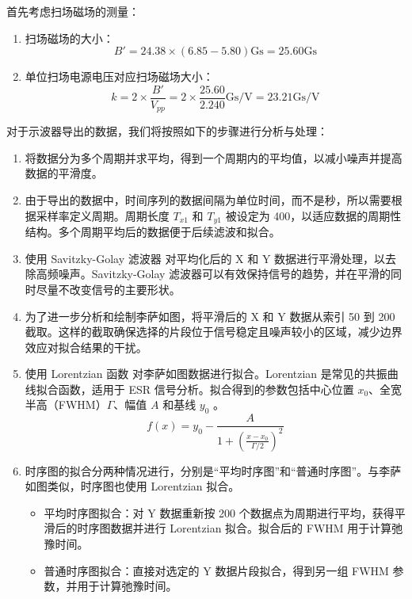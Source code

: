 \documentclass[dvipsnames, svgnames,a4paper,11pt]{article}
\begin{document}
		首先考虑扫场磁场的测量：
		\begin{enumerate}
			\item 扫场磁场的大小：
				\[
					B' = 24.38 \times (6.85 - 5.80) \mathrm{Gs} = 25.60 \mathrm{Gs}
				\]

			\item 单位扫场电源电压对应扫场磁场大小：
				\[
					k = 2 \times \frac{B'}{V_{pp}} = 2 \times \frac{25.60}{2.240} \mathrm{Gs/V} = 23.21 \mathrm{Gs/V}
				\]
		\end{enumerate}



		\vspace{1cm}



		对于示波器导出的数据，我们将按照如下的步骤进行分析与处理：
		\begin{enumerate}
			\item 将数据分为多个周期并求平均，得到一个周期内的平均值，以减小噪声并提高数据的平滑度。
			\item 由于导出的数据中，时间序列的数据间隔为单位时间，而不是秒，所以需要根据采样率定义周期。周期长度 $T_{x1}$ 和 $T_{y1}$ 被设定为 400，以适应数据的周期性结构。多个周期平均后的数据便于后续滤波和拟合。
			\item 使用 Savitzky-Golay 滤波器 对平均化后的 X 和 Y 数据进行平滑处理，以去除高频噪声。Savitzky-Golay 滤波器可以有效保持信号的趋势，并在平滑的同时尽量不改变信号的主要形状。
			\item 为了进一步分析和绘制李萨如图，将平滑后的 X 和 Y 数据从索引 50 到 200 截取。这样的截取确保选择的片段位于信号稳定且噪声较小的区域，减少边界效应对拟合结果的干扰。
			\item 使用 Lorentzian 函数 对李萨如图数据进行拟合。Lorentzian 是常见的共振曲线拟合函数，适用于 ESR 信号分析。拟合得到的参数包括中心位置 $x_0$、全宽半高（FWHM）$\Gamma$、幅值 $A$ 和基线 $y_0$ 。
				\[
					f(x) = y_0 - \frac{A}{1 + (\frac{x - x_0}{\Gamma / 2})^2}
				\]
			\item 时序图的拟合分两种情况进行，分别是“平均时序图”和“普通时序图”。与李萨如图类似，时序图也使用 Lorentzian 拟合。
				\begin{itemize}
					\item 平均时序图拟合：对 Y 数据重新按 200 个数据点为周期进行平均，获得平滑后的时序图数据并进行 Lorentzian 拟合。拟合后的 FWHM 用于计算弛豫时间。
					\item 普通时序图拟合：直接对选定的 Y 数据片段拟合，得到另一组 FWHM 参数，并用于计算弛豫时间。
				\end{itemize}
		\end{enumerate}
\end{document}
